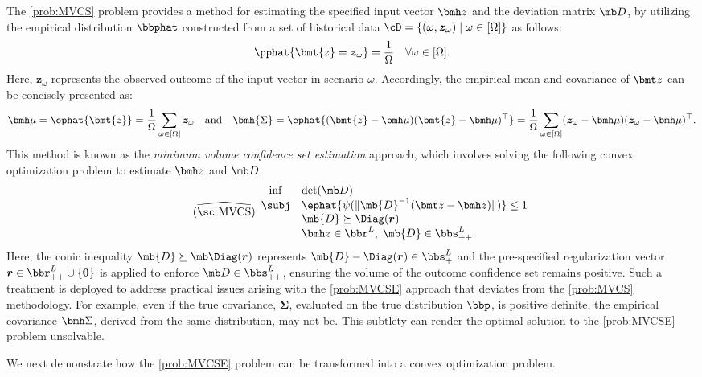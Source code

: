 \documentclass[opre, blindrev]{informs4}
\newcommand{\1}[1]{\mathds{1}{\left(#1\right)}}
\begin{document}
The \ref{prob:MVCS} problem provides a method for estimating the specified input vector $\bmh z$ and the deviation matrix $\mb D$, by utilizing the empirical distribution $\bbphat$ constructed from a set of historical data $\cD = \{(\omega,{\bm z}_\omega) \;|\; \omega \in [\Omega] \}$ as follows:
$$
\pphat{\bmt{ z} = {\bm z}_\omega} = \frac{1}{\Omega} ~~~\forall \omega \in [\Omega].
$$
Here, ${\bm z}_\omega$ represents the observed outcome of the input vector in scenario $\omega$. Accordingly, the empirical mean and covariance of $\bmt z$ can be concisely presented as:
\[
\bmh \mu = \ephat{\bmt {z}} = \frac{1}{\Omega} \sum_{\omega \in [\Omega]} \bm{z}_\omega 
~~~\text{and}~~~
\bmh{\Sigma} = \ephat{(\bmt{z} - \bmh \mu)(\bmt{z} - \bmh \mu)^\top} = 
\frac{1}{\Omega} \sum_{\omega \in [\Omega]} (\bm{z}_\omega - \bmh \mu)(\bm{z}_\omega - \bmh \mu)^\top.
\]
This method is known as the \textit{minimum volume confidence set estimation} approach, which involves solving the following convex optimization problem to estimate $\bmh z$ and $\mb D$:
\begin{equation}
\label{prob:MVCSE}
\tag{$\widehat{\text{\sc MVCS}}$}
\begin{array}{cll}
\inf & \displaystyle\det(\mb D) \\
\subj & \displaystyle\ephat{\psi(\|\mb{D}^{-1}( \bmt z - \bmh z )\|)} \leq 1 \\
& \mb{D} \succeq \Diag(\bm r) \\
& \bmh z \in \bbr^L, \; \mb{D} \in \bbs^{L}_{++}.
\end{array} 
\end{equation}
Here, the conic inequality $\mb{D} \succeq \mb \Diag(\bm r)$ represents $\mb{D} - \Diag(\bm r)\in \bbs^L_+$ and the pre-specified regularization vector $\bm r\in \bbr^L_{++} \cup\{\bm 0\}$ is applied to enforce $\mb D \in \bbs^L_{++}$, ensuring the volume of the outcome confidence set remains positive. Such a treatment is deployed to address practical issues arising with the \ref{prob:MVCSE} approach that deviates from the \ref{prob:MVCS} methodology. For example, even if the true covariance, $\bm \Sigma$, evaluated on the true distribution $\bbp$, is positive definite, the empirical covariance $\bmh \Sigma$, derived from the same distribution, may not be. This subtlety can render the optimal solution to the \ref{prob:MVCSE} problem unsolvable. 

We next demonstrate how the \ref{prob:MVCSE} problem can be transformed into a convex optimization problem. 
\end{document}
